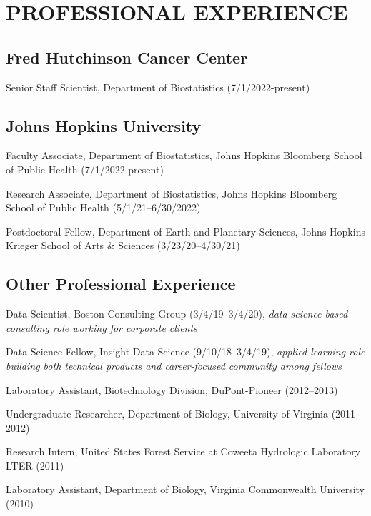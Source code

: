 \documentclass{cv}
\begin{document}
\section*{PROFESSIONAL EXPERIENCE}

\subsection*{Fred Hutchinson Cancer Center}

Senior Staff Scientist, Department of Biostatistics (7/1/2022-present)

\subsection*{Johns Hopkins University}

Faculty Associate, Department of Biostatistics, Johns Hopkins Bloomberg School of Public Health (7/1/2022-present)

Research Associate, Department of Biostatistics, Johns Hopkins Bloomberg School of Public Health (5/1/21--6/30/2022)

Postdoctoral Fellow, Department of Earth and Planetary Sciences, Johns Hopkins Krieger School of Arts \& Sciences (3/23/20--4/30/21)

\subsection*{Other Professional Experience}

Data Scientist, Boston Consulting Group (3/4/19--3/4/20), \textit{data science-based consulting role working for corporate clients}

Data Science Fellow, Insight Data Science (9/10/18--3/4/19), \textit{applied learning role building both technical products and career-focused community among fellows}

Laboratory Assistant, Biotechnology Division, DuPont-Pioneer (2012--2013)

Undergraduate Researcher, Department of Biology, University of Virginia (2011--2012)

Research Intern, United States Forest Service at Coweeta Hydrologic Laboratory LTER (2011)

Laboratory Assistant, Department of Biology, Virginia Commonwealth University (2010)

\end{document}
